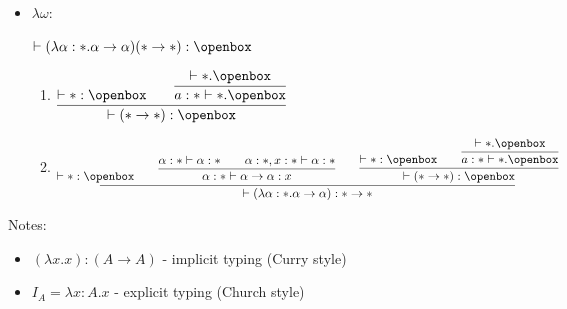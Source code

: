 \documentclass[12pt]{article}
\begin{document}
\begin{itemize}
    \item $\lambda \omega$:
\begin{center}
    $\vdash (\lambda \alpha : * . \alpha \rightarrow \alpha) (* \rightarrow *) : \openbox$

\vspace{5mm}

\begin{enumerate}[]
    \item \begin{center}
        $\vcenter{\infer{\vdash (* \rightarrow *) : \openbox}{\vdash * : \openbox \qquad \infer{a:* \vdash *.\openbox}{\vdash *.\openbox} }}$
    \end{center}
    \item \begin{center} $\vcenter{\infer{\vdash (\lambda \alpha : * . \alpha \rightarrow \alpha) : * \rightarrow *}{\vdash * : \openbox \qquad \infer{\alpha : * \vdash \alpha \rightarrow \alpha : x}{\alpha : * \vdash \alpha : * \qquad \alpha : *, x : * \vdash \alpha : *} \qquad \infer{\vdash (* \rightarrow *) : \openbox}{\vdash * : \openbox \qquad \infer{a:* \vdash *.\openbox}{\vdash *.\openbox} } }}$
    \end{center}
\end{enumerate}
\end{center}


\end{itemize}

Notes:
\begin{itemize}
    \item $(\lambda x.x) : (A \rightarrow A)$ - implicit typing (Curry style)
    \item $I_A = \lambda x : A.x$ - explicit typing (Church style)
\end{itemize}
\end{document}
